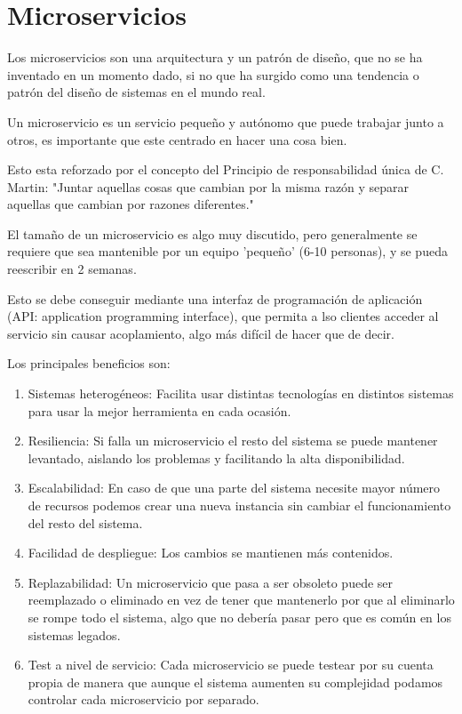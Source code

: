 \section{Microservicios}

Los microservicios son una arquitectura y un patrón de diseño, que no se ha inventado en un momento dado, si no que ha surgido como una tendencia o patrón del diseño de sistemas en el mundo real. 

Un microservicio es un servicio pequeño y autónomo que puede trabajar junto a otros, es importante que este centrado en hacer una cosa bien.

Esto esta reforzado por el concepto del Principio de responsabilidad única de C. Martin: "Juntar aquellas cosas que cambian por la misma razón y separar aquellas que cambian por razones diferentes."

El tamaño de un microservicio es algo muy discutido, pero generalmente se requiere que sea mantenible por un equipo 'pequeño' (6-10 personas), y se pueda reescribir en 2 semanas.

Esto se debe conseguir mediante una interfaz de programación de aplicación (API: application programming interface), que permita a lso clientes acceder al servicio sin causar acoplamiento, algo más difícil de hacer que de decir.

Los principales beneficios son:
\begin{enumerate}
\item Sistemas heterogéneos: Facilita usar distintas tecnologías en distintos sistemas para usar la mejor herramienta en cada ocasión.
\item Resiliencia: Si falla un microservicio el resto del sistema se puede mantener levantado, aislando los problemas y facilitando la alta disponibilidad.
\item Escalabilidad: En caso de que una parte del sistema necesite mayor número de recursos podemos crear una nueva instancia sin cambiar el funcionamiento del resto del sistema.
\item Facilidad de despliegue: Los cambios se mantienen más contenidos.
\item Replazabilidad: Un microservicio que pasa a ser obsoleto puede ser reemplazado o eliminado en vez de tener que mantenerlo por que al eliminarlo se rompe todo el sistema, algo que no debería pasar pero que es común en los sistemas legados.
\item Test a nivel de servicio: Cada microservicio se puede testear por su cuenta propia de manera que aunque el sistema aumenten su complejidad podamos controlar cada microservicio por separado.
\end{enumerate}

